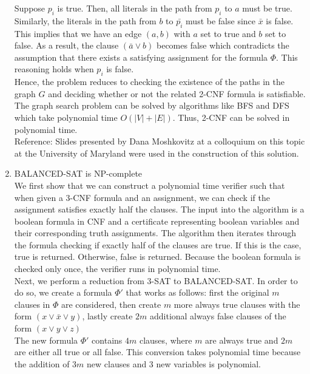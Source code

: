 \documentclass[]{report}
\begin{document}
\begin{enumerate}
	Suppose $p_i$ is true. Then, all literals in the path from $p_i$ to $a$ must be true. Similarly, the literals in the path from $b$ to $\bar{p_i}$ must be false since $\bar{x}$ is false. This implies that we have an edge $(a,b)$ with $a$ set to true and $b$ set to false. As a result, the clause $(\bar{a} \vee b )$ becomes false which contradicts the assumption that there exists a satisfying assignment for the formula $\Phi$.	This reasoning holds when $p_i$ is false. \\
	
	Hence, the problem reduces to checking the existence of the paths in the graph $G$ and deciding whether or not the related 2-CNF formula is satisfiable. The graph search problem can be solved by algorithms like BFS and DFS which take polynomial time $O(|V|+|E|)$. Thus, 2-CNF can be solved in polynomial time. \\
	
	Reference: Slides presented by Dana Moshkovitz  at a colloquium on this topic at the University of Maryland were used in the construction of this solution. \\
	
	\item BALANCED-SAT is NP-complete \\
	
	We first show that we can construct a polynomial time verifier such that when given a 3-CNF formula and an assignment, we can check if the assignment satisfies exactly half the clauses. The input into the algorithm is a boolean formula in CNF and a certificate representing boolean variables and their corresponding truth assignments. The algorithm then iterates through the formula checking if exactly half of the clauses are true. If this is the case, true is returned. Otherwise, false is returned. Because the boolean formula is checked only once, the verifier runs in polynomial time.  \\

	Next, we perform a reduction from 3-SAT to BALANCED-SAT. In order to do so, we create a formula $\Phi'$ that works as follows: first the original $m$ clauses in $\Phi$ are considered, then create $m$ more always true clauses with the form $(x \vee \bar{x} \vee y)$, lastly create $2m$ additional always false clauses of the form $(x \vee y \vee z)$ \\
	
	The new formula $\Phi'$ contains $4m$ clauses, where $m$ are always true and $2m$ are either all true or all false. This conversion takes polynomial time because the addition of  $3m$ new clauses and 3 new variables is polynomial. \\
	

\end{enumerate}
\end{document}
